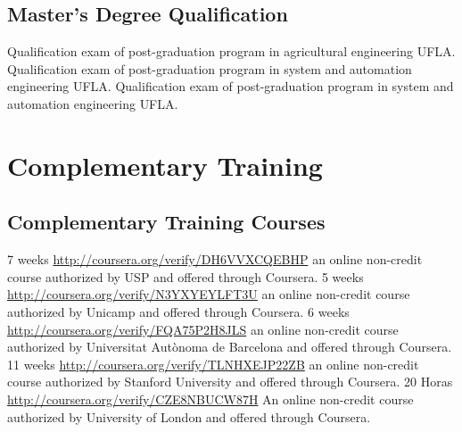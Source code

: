 \documentclass[11pt,a4paper,sans]{moderncv} %
\begin{document}
\subsection{Master's Degree Qualification}
			{}
			{Qualification exam of post-graduation program  in agricultural engineering}{}
			{UFLA.}
			{}
			{Qualification exam of post-graduation program  in system and automation engineering}{}
			{UFLA.}
			{}
			{Qualification exam of post-graduation program  in system and automation engineering}{}
			{UFLA. }



\section{Complementary Training}

\subsection{Complementary Training Courses}
	      {7 weeks}
	      {\url{http://coursera.org/verify/DH6VVXCQEBHP}}{}
	      {an online non-credit course authorized by USP and offered through Coursera.}
	      {5 weeks}
	      {\url{http://coursera.org/verify/N3YXYEYLFT3U}}{}
	      {an online non-credit course authorized by Unicamp and offered through Coursera.}
	      {6 weeks}
	      {\url{http://coursera.org/verify/FQA75P2H8JLS}}{}
	      {an online non-credit course authorized by Universitat Autònoma de Barcelona and offered through Coursera.}
	      {11 weeks}
	      {\url{http://coursera.org/verify/TLNHXEJP22ZB}}{}
	      {an online non-credit course authorized by Stanford University and offered through Coursera.}
	      {20 Horas}
	      {\url{http://coursera.org/verify/CZE8NBUCW87H}}{}
	      {An online non-credit course authorized by University of London and offered through Coursera.}

\end{document}
